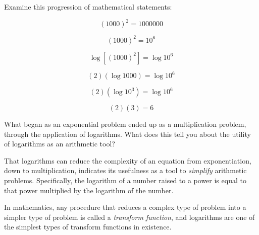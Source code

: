 

Examine this progression of mathematical statements:

$$({1000})^2 = 1000000$$

$$({1000})^2 = 10^6$$

$$\log [({1000})^2] = \log 10^6$$

$$(2)(\log 1000) = \log 10^6$$

$$(2)(\log 10^3) = \log 10^6$$

$$(2)(3) = 6$$

What began as an exponential problem ended up as a multiplication problem, through the application of logarithms.  What does this tell you about the utility of logarithms as an arithmetic tool?







That logarithms can reduce the complexity of an equation from exponentiation, down to multiplication, indicates its usefulness as a tool to {\it simplify} arithmetic problems.  Specifically, the logarithm of a number raised to a power is equal to that power multiplied by the logarithm of the number.







In mathematics, any procedure that reduces a complex type of problem into a simpler type of problem is called a {\it transform function}, and logarithms are one of the simplest types of transform functions in existence.




